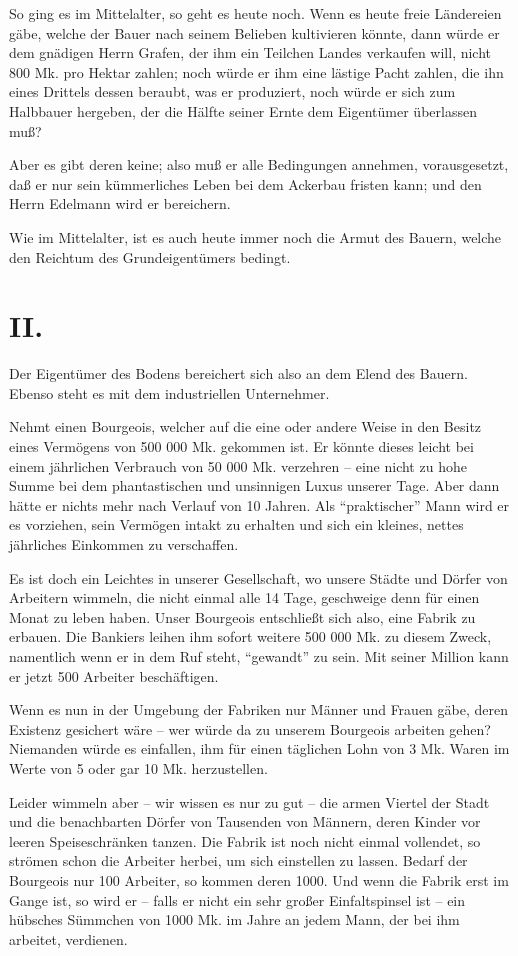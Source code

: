 \documentclass{scrbook}
\begin{document}
So ging es im Mittelalter, so geht es heute noch. Wenn es heute freie Ländereien gäbe, welche der Bauer nach seinem Belieben kultivieren könnte, dann würde er dem gnädigen Herrn Grafen, der ihm ein Teilchen Landes verkaufen will, nicht 800 Mk. pro Hektar zahlen; noch würde er ihm eine lästige Pacht zahlen, die ihn eines Drittels dessen beraubt, was er produziert, noch würde er sich zum Halbbauer hergeben, der die Hälfte seiner Ernte dem Eigentümer überlassen muß?

Aber es gibt deren keine; also muß er alle Bedingungen annehmen, vorausgesetzt, daß er nur sein kümmerliches Leben bei dem Ackerbau fristen kann; und den Herrn Edelmann wird er bereichern.

Wie im Mittelalter, ist es auch heute immer noch die Armut des Bauern, welche den Reichtum des Grundeigentümers bedingt.

\section*{II.}

Der Eigentümer des Bodens bereichert sich also an dem Elend des Bauern. Ebenso steht es mit dem industriellen Unternehmer.

Nehmt einen Bourgeois, welcher auf die eine oder andere Weise in den Besitz eines Vermögens von 500 000 Mk. gekommen ist. Er könnte dieses leicht bei einem jährlichen Verbrauch von 50 000 Mk. verzehren – eine nicht zu hohe Summe bei dem phantastischen und unsinnigen Luxus unserer Tage. Aber dann hätte er nichts mehr nach Verlauf von 10 Jahren. Als ``praktischer'' Mann wird er es vorziehen, sein Vermögen intakt zu erhalten und sich ein kleines, nettes jährliches Einkommen zu verschaffen.

Es ist doch ein Leichtes in unserer Gesellschaft, wo unsere Städte und Dörfer von Arbeitern wimmeln, die nicht einmal alle 14 Tage, geschweige denn für einen Monat zu leben haben. Unser Bourgeois entschließt sich also, eine Fabrik zu erbauen. Die Bankiers leihen ihm sofort weitere 500 000 Mk. zu diesem Zweck, namentlich wenn er in dem Ruf steht, ``gewandt'' zu sein. Mit seiner Million kann er jetzt 500 Arbeiter beschäftigen.

Wenn es nun in der Umgebung der Fabriken nur Männer und Frauen gäbe, deren Existenz gesichert wäre – wer würde da zu unserem Bourgeois arbeiten gehen? Niemanden würde es einfallen, ihm für einen täglichen Lohn von 3 Mk. Waren im Werte von 5 oder gar 10 Mk. herzustellen.

Leider wimmeln aber – wir wissen es nur zu gut – die armen Viertel der Stadt und die benachbarten Dörfer von Tausenden von Männern, deren Kinder vor leeren Speiseschränken tanzen. Die Fabrik ist noch nicht einmal vollendet, so strömen schon die Arbeiter herbei, um sich einstellen zu lassen. Bedarf der Bourgeois nur 100 Arbeiter, so kommen deren 1000. Und wenn die Fabrik erst im Gange ist, so wird er – falls er nicht ein sehr großer Einfaltspinsel ist – ein hübsches Sümmchen von 1000 Mk. im Jahre an jedem Mann, der bei ihm arbeitet, verdienen.
\end{document}
